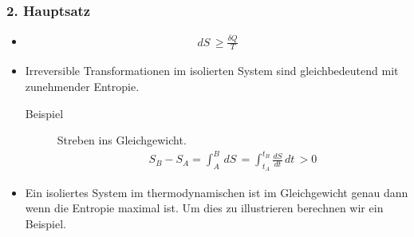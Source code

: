 \documentclass[11pt]{article}
\theoremstyle{plain}
\theoremstyle{mytheoremstyle}
\newcommand{\dd}[2]{\frac{d{#1}}{d{#2}}}
\renewcommand{\d}[1]{\,d#1\,}
\begin{document}
\subsubsection*{2. Hauptsatz}
\begin{itemize}
  \item %
    \begin{align*}
      \d{S} \ge 
      \frac{\delta Q}{T}
    \end{align*}
  \item 
    Irreversible Transformationen im isolierten System sind gleichbedeutend
    mit zunehmender Entropie.
    \begin{description}
      \item[Beispiel] Streben ins Gleichgewicht.
        \begin{align*}
          S_B - S_A = \int_{A}^{B} \d{S} = \int_{t_A}^{t_B} \dd{S}{t} \d{t}  > 0
        \end{align*}
    \end{description}
  \item Ein isoliertes System im thermodynamischen ist im Gleichgewicht
    genau dann wenn die Entropie maximal ist. Um dies zu illustrieren
    berechnen wir ein Beispiel.
\end{itemize}
\end{document}

